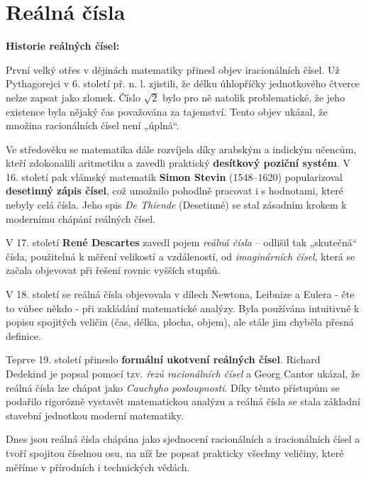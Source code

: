 \documentclass[12pt,a4paper]{article}
\begin{document}
\newpage

\section{Reálná čísla}
\begin{historicalbox}
\textbf{Historie reálných čísel:}  

První velký otřes v dějinách matematiky přinesl objev iracionálních čísel.  
Už Pythagorejci v 6. století př. n. l. zjistili, že délku úhlopříčky jednotkového čtverce nelze 
zapsat jako zlomek. Číslo $\sqrt{2}$ bylo pro ně natolik problematické, že jeho existence byla 
nějaký čas považována za tajemství. Tento objev ukázal, že množina racionálních čísel není „úplná“.  

Ve středověku se matematika dále rozvíjela díky arabským a indickým učencům, kteří zdokonalili aritmetiku 
a zavedli praktický \textbf{desítkový poziční systém}. 
V 16. století pak vlámský matematik \textbf{Simon Stevin} (1548–1620) 
popularizoval \textbf{desetinný zápis čísel}, což umožnilo pohodlně pracovat i s hodnotami, 
které nebyly celá čísla. Jeho spis \textit{De Thiende} (Desetinné) se stal zásadním krokem 
k modernímu chápání reálných čísel.  

V 17. století \textbf{René Descartes} zavedl pojem \textit{reálná čísla} – odlišil 
tak „skutečná“ čísla, použitelná k měření velikostí a vzdáleností, od \textit{imaginárních čísel}, 
která se začala objevovat při řešení rovnic vyšších stupňů.  

V 18. století se reálná čísla objevovala v dílech Newtona, Leibnize a Eulera - čte to vůbec někdo -
při zakládání matematické analýzy. Byla používána intuitivně 
k popisu spojitých veličin (čas, délka, plocha, objem), ale stále jim chyběla přesná definice.  

Teprve 19. století přineslo \textbf{formální ukotvení reálných čísel}. 
Richard Dedekind je popsal pomocí tzv. \textit{řezů racionálních čísel} a 
Georg Cantor ukázal, že reálná čísla lze chápat jako \textit{Cauchyho posloupnosti}. 
Díky těmto přístupům se podařilo rigorózně vystavět matematickou analýzu a 
reálná čísla se stala základní stavební jednotkou moderní matematiky.  

Dnes jsou reálná čísla chápána jako sjednocení racionálních a 
iracionálních čísel a tvoří spojitou číselnou osu, 
na níž lze popsat prakticky všechny veličiny, které měříme v přírodních i technických vědách.
\end{historicalbox}
\end{document}
